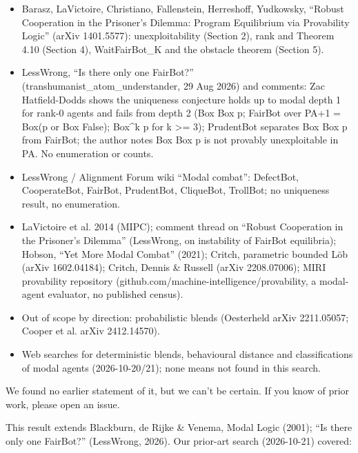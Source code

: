 \documentclass{article}
\begin{document}
\begin{itemize}
\item Barasz, LaVictoire, Christiano, Fallenstein, Herreshoff, Yudkowsky, ``Robust Cooperation in the Prisoner's Dilemma: Program Equilibrium via Provability Logic'' (arXiv 1401.5577): unexploitability (Section 2), rank and Theorem 4.10 (Section 4), WaitFairBot\_K and the obstacle theorem (Section 5).
\item LessWrong, ``Is there only one FairBot?'' (transhumanist\_atom\_understander, 29 Aug 2026) and comments: Zac Hatfield-Dodds shows the uniqueness conjecture holds up to modal depth 1 for rank-0 agents and fails from depth 2 (Box Box p; FairBot over PA+1 = Box(p or Box False); Box\textasciicircum{}k p for k \textgreater{}= 3); PrudentBot separates Box Box p from FairBot; the author notes Box Box p is not provably unexploitable in PA. No enumeration or counts.
\item LessWrong / Alignment Forum wiki ``Modal combat'': DefectBot, CooperateBot, FairBot, PrudentBot, CliqueBot, TrollBot; no uniqueness result, no enumeration.
\item LaVictoire et al. 2014 (MIPC); comment thread on ``Robust Cooperation in the Prisoner's Dilemma'' (LessWrong, on instability of FairBot equilibria); Hobson, ``Yet More Modal Combat'' (2021); Critch, parametric bounded Löb (arXiv 1602.04184); Critch, Dennis \& Russell (arXiv 2208.07006); MIRI provability repository (github.com/machine-intelligence/provability, a modal-agent evaluator, no published census).
\item Out of scope by direction: probabilistic blends (Oesterheld arXiv 2211.05057; Cooper et al. arXiv 2412.14570).
\item Web searches for deterministic blends, behavioural distance and classifications of modal agents (2026-10-20/21); none means not found in this search.
\end{itemize}

We found no earlier statement of it, but we can't be certain. If you know of prior work, please open an issue.

This result extends Blackburn, de Rijke \& Venema, Modal Logic (2001); ``Is there only one FairBot?'' (LessWrong, 2026). Our prior-art search (2026-10-21) covered:
\end{document}
